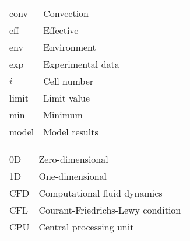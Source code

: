 \begin{longtable}[l]{ll} %
  conv & Convection \\
  eff & Effective \\
  env & Environment \\
  exp & Experimental data \\
  $i$ & Cell number \\
  limit & Limit value \\
  min & Minimum \\
  model & Model results \\
\end{longtable}


\begin{table}[H]
  \fontsize{\fontSize}{\lineSpacing}\selectfont
  \begin{longtable}[l]{ll} %
    0D & Zero-dimensional \\
    1D & One-dimensional \\
    CFD & Computational fluid dynamics \\
    CFL & Courant-Friedrichs-Lewy condition \\
    CPU & Central processing unit \\
  \end{longtable}
\end{table}

